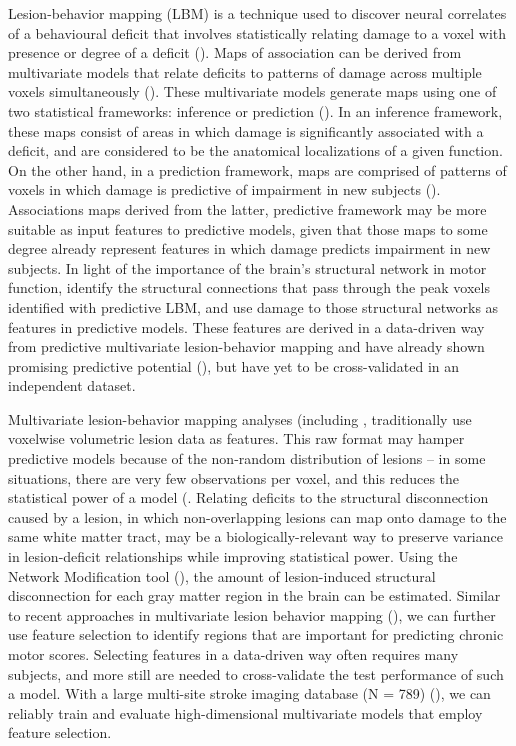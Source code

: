 \documentclass[10pt]{article}
\begin{document}
Lesion-behavior mapping (LBM) is a technique used to discover neural correlates of a behavioural deficit that involves statistically relating damage to a voxel with presence or degree of a deficit (\cite{Karnath2020-cg, Bates2003-eg}). Maps of association can be derived from multivariate models that relate deficits to patterns of damage across multiple voxels simultaneously (\cite{Ivanova2021-nh, Karnath2020-cg, Zhang2014-jd, Sperber2020-kp}). These  multivariate models generate maps using one of two statistical frameworks: inference or prediction (\cite{Sperber2020-kp, Bzdok2020-py}). In an inference framework, these maps consist of areas in which damage is significantly associated with a deficit, and are considered to be the anatomical localizations of a given function. On the other hand, in a prediction framework, maps are comprised of patterns of voxels in which damage is predictive of impairment in new subjects (\cite{Bowren2022-rs, Mah2014-cb,Rondina2017-ij, Sperber2020-kp, Dulyan2021-jf}). Associations maps derived from the latter, predictive framework may be more suitable as input features to predictive models, given that those maps to some degree already represent features in which damage predicts impairment in new subjects. In light of the importance of the brain's structural network in motor function, \cite{Bowren2022-rs} identify the structural connections that pass through the peak voxels identified with predictive LBM, and use damage to those structural networks as features in predictive models. These features are derived in a data-driven way from predictive multivariate lesion-behavior mapping and have already shown promising predictive potential (\cite{Bowren2022-rs}), but have yet to be cross-validated in an independent dataset. 

Multivariate lesion-behavior mapping analyses (including \cite{Bowren2022-rs}, traditionally use voxelwise volumetric lesion data as features. This raw format may hamper predictive models because of the non-random distribution of lesions -- in some situations, there are very few observations per voxel, and this reduces the statistical power of a model (\cite{Kimberg2007-sk, Rorden2009-ae,Sperber2020-kp}. Relating deficits to the structural disconnection caused by a lesion, in which non-overlapping lesions can map onto damage to the same white matter tract, may be a biologically-relevant way to preserve variance in lesion-deficit relationships while improving statistical power. Using the Network Modification tool (\cite{Kuceyeski2013-nk}), the amount of lesion-induced structural disconnection for each gray matter region in the brain can be estimated. Similar to recent approaches in multivariate lesion behavior mapping (\cite{Kasties2021-rm}), we can further use feature selection to identify regions that are important for predicting chronic motor scores. Selecting features in a data-driven way often requires many subjects, and more still are needed to cross-validate the test performance of such a model. With a large multi-site stroke imaging database (N = 789) (\cite{Liew2020-ps}), we can reliably train and evaluate high-dimensional multivariate models that employ feature selection. 
\end{document}
